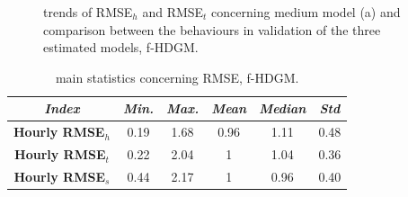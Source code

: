 \begin{figure}
	\centering
	\quad
	\quad
	\caption[Trends of RMSE$_h$ and RMSE$_t$ concerning medium model and comparison between the behaviours in validation of the three estimated models (f-HDGM)]{trends of RMSE$_h$ and RMSE$_t$ concerning medium model (a) and comparison between the behaviours in validation of the three estimated models, f-HDGM.}
\end{figure}

\begin{table}
	\centering
	\renewcommand\arraystretch{1.3}
	\begin{tabular}{c|c|c|c|c|c}
		\hline
		\textit{Index} & \textit{Min.} & \textit{Max.} & \textit{Mean} & \textit{Median} & \textit{Std}\\
		\hline
		\textbf{Hourly RMSE$_h$} & \num{0.19} & \num{1.68} & \num{0.96} & \num{1.11} & \num{0.48}\\
		\hline
		\textbf{Hourly RMSE$_t$} & \num{0.22} & \num{2.04} & \num{1} & \num{1.04} & \num{0.36} \\
		\hline
		\textbf{Hourly RMSE$_s$} & \num{0.44} & \num{2.17} & \num{1} & \num{0.96} & \num{0.40}\\
		\hline
	\end{tabular}
	\caption[Main statistics concerning RMSE (f-HDGM)]{main statistics concerning RMSE, f-HDGM.}
	\label{RMSE_f-HDGM_stats}
\end{table}